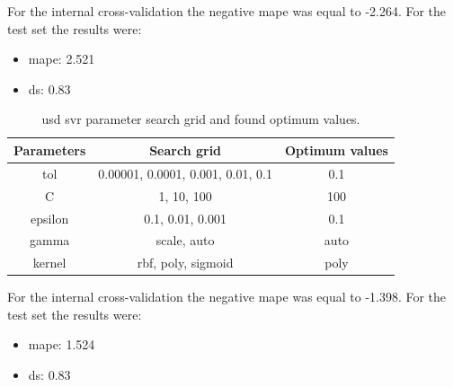 For the internal cross-validation the negative \gls{mape} was equal to -2.264. For the test set the results were:
\begin{itemize}
    \item \Gls{mape}: 2.521
    \item \Gls{ds}: 0.83
\end{itemize}

\begin{table}[H]
    \centering
    \begin{tabular}{|c|c|c|}
        \hline
        Parameters & Search grid & Optimum values \\
        \hline
        \hline
        tol & 0.00001, 0.0001, 0.001, 0.01, 0.1 & 0.1 \\
        \hline
        C & 1, 10, 100 & 100 \\
        \hline
        epsilon & 0.1, 0.01, 0.001 & 0.1 \\
        \hline
        gamma & scale, auto & auto \\
        \hline
        kernel & rbf, poly, sigmoid & poly \\
        \hline
    \end{tabular}
    \caption{\gls{usd} \gls{svr} parameter search grid and found optimum values.}
\end{table}

For the internal cross-validation the negative \gls{mape} was equal to -1.398. For the test set the results were:
\begin{itemize}
    \item \Gls{mape}: 1.524
    \item \Gls{ds}: 0.83
\end{itemize}

